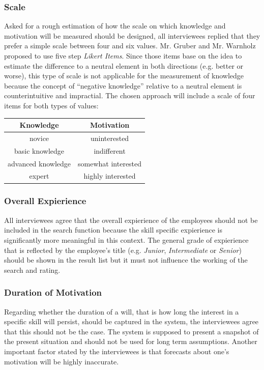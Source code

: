 \newpage

\subsubsection{Scale}
Asked for a rough estimation of how the scale on which knowledge and motivation will be measured should be designed, all interviewees replied that they prefer a simple scale between four and six values. Mr. Gruber and Mr. Warnholz proposed to use five step \textit{Likert Items}. Since those items base on the idea to estimate the difference to a neutral element in both directions (e.g. better or worse), this type of scale is not applicable for the measurement of knowledge because the concept of ``negative knowledge'' relative to a neutral element is counterintuitive and impractial. The chosen approach will include a scale of four items for both types of values:
\begin{center}
\begin{tabular}{c|c}
	Knowledge & Motivation \\
	\hline
	novice & uninterested\\
	basic knowledge & indifferent\\
	advanced knowledge & somewhat interested\\
	expert & highly interested\\
\end{tabular}
\end{center}


\subsubsection{Overall Expierience}
All interviewees agree that the overall expierience of the employees should not be included in the search function because the skill specific expierience is significantly more meaningful in this context. The general grade of expierience that is reflected by the employee's title (e.g. \textit{Junior}, \textit{Intermediate} or \textit{Senior}) should be shown in the result list but it must not influence the working of the search and rating.

\subsubsection{Duration of Motivation}
Regarding whether the duration of a will, that is how long the interest in a specific skill will persist, should be captured in the system, the interviewees agree that this should not be the case. The system is supposed to present a snapshot of the present situation and should not be used for long term assumptions. Another important factor stated by the interviewees is that forecasts about one's motivation will be highly inaccurate.

